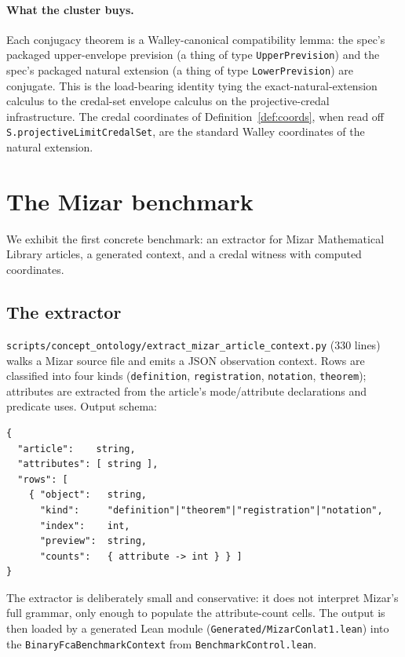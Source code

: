 \documentclass[]{article}
\newcommand{\lid}[1]{{\ttfamily\nolinkurl{#1}}}
\newcommand{\lpath}[1]{\texttt{\nolinkurl{#1}}}
\begin{document}
\paragraph{What the cluster buys.} Each conjugacy theorem is a Walley-canonical
compatibility lemma: the spec's packaged upper-envelope prevision (a thing of type
\lid{UpperPrevision}) and the spec's packaged natural extension (a thing of type
\lid{LowerPrevision}) are conjugate. This is the load-bearing identity tying the
exact-natural-extension calculus to the credal-set envelope calculus on the
projective-credal infrastructure. The credal coordinates of
Definition~\ref{def:coords}, when read off
\lid{S.projectiveLimitCredalSet}, are the standard Walley coordinates of the
natural extension.

\section{The Mizar benchmark}\label{sec:mizar}

We exhibit the first concrete benchmark: an extractor for Mizar Mathematical
Library articles, a generated context, and a credal witness with computed
coordinates.

\subsection{The extractor}\label{sec:mizar-extractor}

\lpath{scripts/concept\_ontology/extract\_mizar\_article\_context.py} (330 lines)
walks a Mizar source file and emits a JSON observation context. Rows are
classified into four kinds (\lid{definition}, \lid{registration}, \lid{notation},
\lid{theorem}); attributes are extracted from the article's mode/attribute declarations
and predicate uses. Output schema:

\begin{lstlisting}
{
  "article":    string,
  "attributes": [ string ],
  "rows": [
    { "object":   string,
      "kind":     "definition"|"theorem"|"registration"|"notation",
      "index":    int,
      "preview":  string,
      "counts":   { attribute -> int } } ]
}
\end{lstlisting}

\noindent The extractor is deliberately small and conservative: it does not interpret
Mizar's full grammar, only enough to populate the attribute-count cells. The output
is then loaded by a generated Lean module
(\lpath{Generated/MizarConlat1.lean}) into the
\lid{BinaryFcaBenchmarkContext} from \lpath{BenchmarkControl.lean}.
\end{document}
